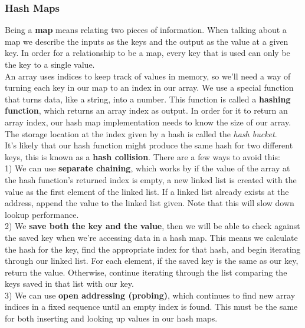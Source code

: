 \documentclass[11pt, a4paper]{article}
\begin{document}
\begin{spacing}{1.1}
	\subsubsection{Hash Maps}
	Being a \textbf{map} means relating two pieces of information. When talking about a map we describe the inputs as the keys and the output as the value at a given key. In order for a relationship to be a map, every key that is used can only be the key to a single value. \vspace*{2mm} \\
	An array uses indices to keep track of values in memory, so we’ll need a way of turning each key in our map to an index in our array. We use a special function that turns data, like a string, into a number. This function is called a \textbf{hashing function}, which returns an array index as output. In order for it to return an array index, our hash map implementation needs to know the size of our array. The storage location at the index given by a hash is called the \textit{hash bucket}. \vspace*{2mm} \\
	It’s likely that our hash function might produce the same hash for two different keys, this is known as a \textbf{hash collision}. There are a few ways to avoid this: \vspace*{1mm} \\
	1) We can use \textbf{separate chaining}, which works by if the value of the array at the hash function’s returned index is empty, a new linked list is created with the value as the first element of the linked list. If a linked list already exists at the address, append the value to the linked list given. Note that this will slow down lookup performance. \vspace*{1mm} \\
	2) We \textbf{save both the key and the value}, then we will be able to check against the saved key when we’re accessing data in a hash map. This means we calculate the hash for the key, find the appropriate index for that hash, and begin iterating through our linked list. For each element, if the saved key is the same as our key, return the value. Otherwise, continue iterating through the list comparing the keys saved in that list with our key. \vspace*{1mm} \\
	3) We can use \textbf{open addressing (probing)}, which continues to find new array indices in a fixed sequence until an empty index is found. This must be the same for both inserting and looking up values in our hash maps. \vspace*{2mm} \\

\end{spacing}
\end{document}
